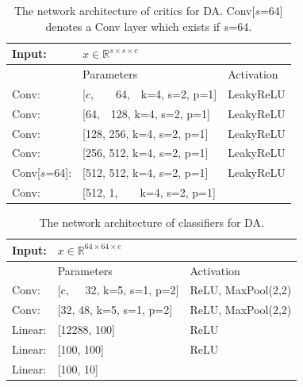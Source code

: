 \documentclass[runningheads]{llncs}
\begin{document}
\begin{table}
	\vspace{-40pt}
	\centering
	\caption{The network architecture of critics for DA. Conv[$s$=64] denotes a Conv layer which exists if $s$=64.}
	\vspace{3pt}
	\begin{tabular}{lll}
		\toprule[2pt]
		Input: & $x \in \mathbb{R}^{s\times s\times c}$ & \\
		\hline
		& Parameters & Activation \\
		\hline
		Conv: & [$c$,~~~~64,~~k=4, s=2, p=1] & LeakyReLU \\
		\hline
		Conv: & [64,~~128, k=4, s=2, p=1] & LeakyReLU \\
		\hline
		Conv: & [128, 256, k=4, s=2, p=1] & LeakyReLU \\
		\hline 
		Conv: & [256, 512, k=4, s=2, p=1] & LeakyReLU \\
		\hline 
		Conv[$s$=64]: & [512, 512, k=4, s=2, p=1] & LeakyReLU \\
		\hline 
		Conv: & [512, 1,~~~~k=4, s=2, p=1] \\
		\bottomrule[2pt]
	\end{tabular}
	\label{da_discriminator_image64}
	\vspace{-10pt}
\end{table}

\begin{table}
	\vspace{-30pt}
	\centering
	\caption{The network architecture of classifiers for DA.}
	\vspace{3pt}
	\begin{tabular}{lll}
		\toprule[2pt]
		Input: & $x \in \mathbb{R}^{64\times 64\times c}$ & \\
		\hline
		& Parameters & Activation \\
		\hline
		Conv: & [$c$,~~~32, k=5, s=1, p=2] & ReLU, MaxPool(2,2) \\
		\hline
		Conv: & [32, 48, k=5, s=1, p=2] & ReLU, MaxPool(2,2) \\
		\hline
		Linear: & [12288, 100] & ReLU \\
		\hline 
		Linear: & [100, 100] & ReLU  \\
		\hline
		Linear: & [100, 10] \\
		\bottomrule[2pt]
	\end{tabular}
	\label{da_classifier_lenet}
	\vspace{-20pt}
\end{table}
\end{document}
